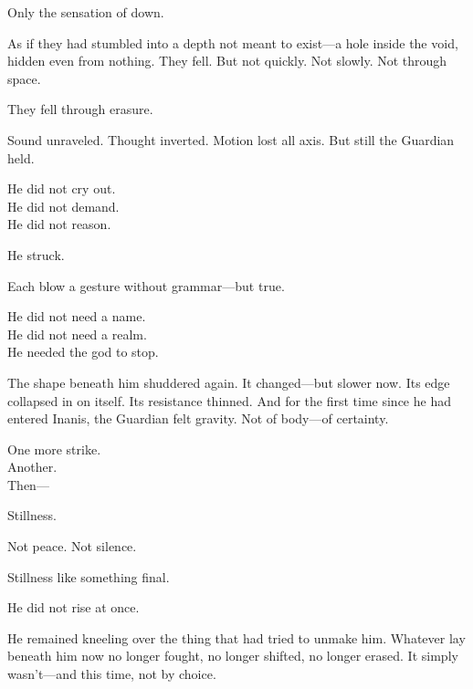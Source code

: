 \documentclass[12pt]{article}
\begin{document}
\vspace{0.5em}
Only the sensation of down.

\vspace{0.5em}
As if they had stumbled into a depth not meant to exist---a hole inside the void, hidden even from nothing. They fell. But not quickly. Not slowly. Not through space.

\vspace{0.5em}
They fell through erasure.

\vspace{0.5em}
Sound unraveled. Thought inverted. Motion lost all axis. But still the Guardian held.

\vspace{0.5em}
He did not cry out.\\
He did not demand.\\
He did not reason.

\vspace{0.5em}
He struck.

\vspace{0.5em}
Each blow a gesture without grammar---but true.

\vspace{0.5em}
He did not need a name.\\
He did not need a realm.\\
He needed the god to stop.

\vspace{0.5em}
The shape beneath him shuddered again. It changed---but slower now. Its edge collapsed in on itself. Its resistance thinned. And for the first time since he had entered Inanis, the Guardian felt gravity. Not of body---of certainty.

\vspace{0.5em}
One more strike.\\
Another.\\
Then---

\vspace{0.5em}
Stillness.

\vspace{0.5em}
Not peace. Not silence.

\vspace{0.5em}
Stillness like something final.

\vspace{0.5em}
He did not rise at once.

\vspace{0.5em}
He remained kneeling over the thing that had tried to unmake him. Whatever lay beneath him now no longer fought, no longer shifted, no longer erased. It simply wasn’t---and this time, not by choice.
\end{document}
